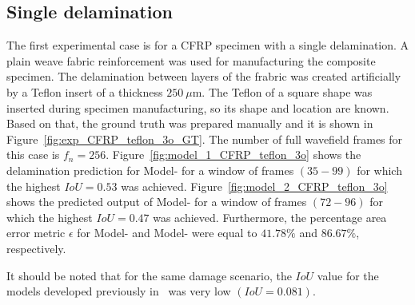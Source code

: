 \subsection{Single delamination}
The first experimental case is for a CFRP specimen with a single delamination. 
A plain weave fabric reinforcement was used for manufacturing the composite specimen.
The delamination between layers of the frabric was created artificially by a Teflon insert of a thickness \(250\ \mu\)m. 
The Teflon of a square shape was inserted during specimen manufacturing, so its shape and location are known.
Based on that, the ground truth was prepared manually and it is shown in 
Figure~\ref{fig:exp_CFRP_teflon_3o_GT}. 
The number of full wavefield frames for this case is \(f_n=256\).
Figure~\ref{fig:model_1_CFRP_teflon_3o} shows the delamination prediction for Model- for a window of frames \((35-99)\) for which the highest \(IoU=0.53\) was achieved.
Figure~\ref{fig:model_2_CFRP_teflon_3o} shows the predicted output of Model- for a window of frames \((72-96)\) for which the highest \(IoU=0.47\) was achieved.
Furthermore, the percentage area error metric \(\epsilon\) for Model- and Model- were equal to \(41.78 \%\) and \(86.67\%\), respectively.

It should be noted that for the same damage scenario, the \(IoU\) value for the models developed previously in~\cite{Ijjeh2021} was very low \((IoU=0.081)\).


